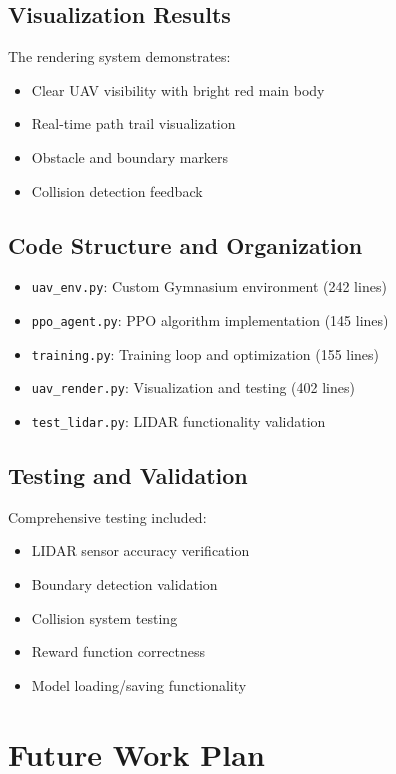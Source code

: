 \documentclass[12pt,a4paper]{article}
\begin{document}
\subsection{Visualization Results}
The rendering system demonstrates:
\begin{itemize}
    \item Clear UAV visibility with bright red main body
    \item Real-time path trail visualization
    \item Obstacle and boundary markers
    \item Collision detection feedback
\end{itemize}

\subsection{Code Structure and Organization}
\begin{itemize}
    \item \texttt{uav\_env.py}: Custom Gymnasium environment (242 lines)
    \item \texttt{ppo\_agent.py}: PPO algorithm implementation (145 lines)
    \item \texttt{training.py}: Training loop and optimization (155 lines)
    \item \texttt{uav\_render.py}: Visualization and testing (402 lines)
    \item \texttt{test\_lidar.py}: LIDAR functionality validation
\end{itemize}

\subsection{Testing and Validation}
Comprehensive testing included:
\begin{itemize}
    \item LIDAR sensor accuracy verification
    \item Boundary detection validation
    \item Collision system testing
    \item Reward function correctness
    \item Model loading/saving functionality
\end{itemize}

\section{Future Work Plan}
\end{document}

